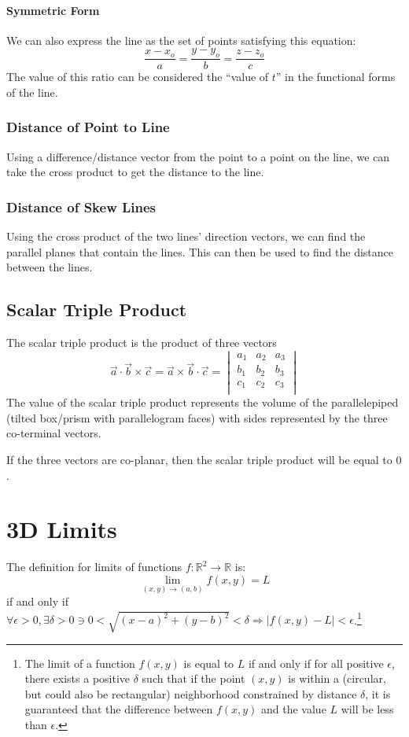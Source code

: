 \documentclass{article}
\newcommand{\vect}[1]{\ensuremath{\overrightarrow{#1}}}
\newcommand{\abs}[1]{\left|#1\right|}
\begin{document}
\paragraph{Symmetric Form}
We can also express the line as the set of points satisfying this equation:
$$
\frac{x-x_o}{a} = \frac{y-y_o}{b} = \frac{z-z_o}{c}
$$
The value of this ratio can be considered the ``value of $t$'' in the functional forms of the line.

\subsubsection{Distance of Point to Line}
Using a difference/distance vector from the point to a point on the line, we can take the cross product to get the distance to the line.

\subsubsection{Distance of Skew Lines}
Using the cross product of the two lines' direction vectors, we can find the parallel planes that contain the lines. This can then be used to find the distance between the lines.

\subsection{Scalar Triple Product}
The scalar triple product is the product of three vectors
\[
    \vect{a}\cdot\vect{b}\times\vect{c}=\vect{a}\times\vect{b}\cdot\vect{c} =
    \begin{vmatrix}
        a_1 & a_2 & a_3\\
        b_1 & b_2 & b_3\\
        c_1 & c_2 & c_3\\
    \end{vmatrix}
\]
The value of the scalar triple product represents the volume of the parallelepiped (tilted box/prism with parallelogram faces) with sides represented by the three co-terminal vectors.

If the three vectors are co-planar, then the scalar triple product will be equal to $0$.

\section{3D Limits}
The definition for limits of functions $f: \mathbb{R}^2 \to \mathbb{R}$ is:
\[
    \lim_{(x,y)\to(a,b)}f(x,y) = L
\] if and only if $\forall\epsilon>0, \exists\delta>0 \ni 0<\sqrt{(x-a)^2+(y-b)^2}<\delta \Rightarrow \abs{f(x,y) - L}<\epsilon$.\footnote{The limit of a function $f(x,y)$ is equal to $L$ if and only if for all positive $\epsilon$, there exists a positive $\delta$ such that if the point $(x,y)$ is within a (circular, but could also be rectangular) neighborhood constrained by distance $\delta$, it is guaranteed that the difference between $f(x,y)$ and the value $L$ will be less than $\epsilon$.}
\end{document}
